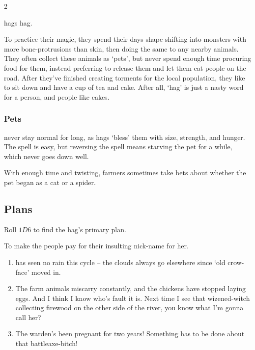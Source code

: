 \begin{multicols}{2}

\noindent
\Glspl{hag} \glsdesc{hag}.

To practice their magic, they spend their days shape-shifting into monsters with more bone-protrusions than skin, then doing the same to any nearby animals.
They often collect these animals as `pets', but never spend enough time procuring food for them, instead preferring to release them and let them eat people on the road.
After they've finished creating torments for the local population, they like to sit down and have a cup of tea and cake.
After all, `hag' is just a nasty word for a person, and people like cakes.

\hag

\showStdSpells

\subsubsection{Pets}
never stay normal for long, as hags `bless' them with size, strength, and hunger.
The spell is easy, but reversing the spell means starving the pet for a while, which never goes down well.

\ifodd\value{r4}
\else
\fi

With enough time and twisting, farmers sometimes take bets about whether the pet began as a cat or a spider.

\subsection{Plans}

Roll $1D6$ to find the hag's primary plan.

\begin{dlist}
  \item
  To make the people pay for their insulting nick-name for her.
  \begin{enumerate}
    \item
     has seen no rain this \gls{cycle} -- the clouds always go elsewhere since `old crow-face' moved in.
    \item
    The farm animals miscarry constantly, and the chickens have stopped laying eggs.
    And I think I know who's fault it is.
    Next time I see that wizened-\gls{witch} collecting firewood on the other side of the river, you know what I'm gonna call her?
    \item
    The \gls{warden}'s been pregnant for two years!
    Something has to be done about that battleaxe-bitch!
  \end{enumerate}


\end{dlist}
\end{multicols}
